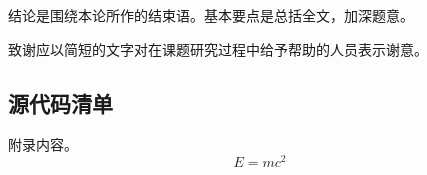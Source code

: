 \documentclass{ccu_thesis}
\begin{document}

结论是围绕本论所作的结束语。基本要点是总括全文，加深题意。



致谢应以简短的文字对在课题研究过程中给予帮助的人员表示谢意。

\begin{appendices}
    \section{源代码清单}
    附录内容。
    \begin{equation}\label{eq:appendices}
        E = mc^2 
    \end{equation}
\end{appendices}
\end{document}
